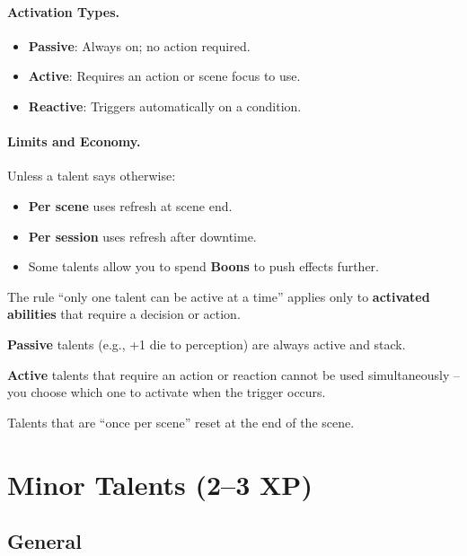\documentclass[12pt,a4paper]{book}
\begin{document}
\paragraph{Activation Types.}
\label{sec:talent-activation}
\begin{itemize}
\item \textbf{Passive}: Always on; no action required.
\item \textbf{Active}: Requires an action or scene focus to use.
\item \textbf{Reactive}: Triggers automatically on a condition.
\end{itemize}

\paragraph{Limits and Economy.}
\label{sec:talent-limits}
Unless a talent says otherwise:
\begin{itemize}
\item \textbf{Per scene} uses refresh at scene end.
\item \textbf{Per session} uses refresh after downtime.
\item Some talents allow you to spend \textbf{Boons} to push effects further.
\end{itemize}

\begin{tcolorbox}[colback=yellow!5!white,colframe=yellow!75!black,title=\textbf{Only One Active Talent?},breakable]
The rule ``only one talent can be active at a time'' applies only to \textbf{activated abilities} that require a decision or action.  

\textbf{Passive} talents (e.g., +1 die to perception) are always active and stack.  

\textbf{Active} talents that require an action or reaction cannot be used simultaneously -- you choose which one to activate when the trigger occurs.  

Talents that are ``once per scene'' reset at the end of the scene.
\end{tcolorbox}

\section{Minor Talents (2--3 XP)}
\label{sec:minor-talents}

\subsection*{General}
\label{sec:minor-general}
\end{document}
